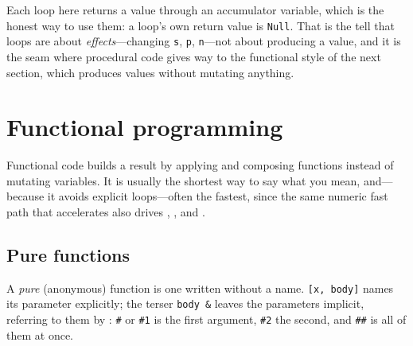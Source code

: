 Each loop here returns a value through an accumulator variable, which is the
honest way to use them: a loop's own return value is \texttt{Null}. That is the
tell that loops are about \emph{effects}---changing \texttt{s}, \texttt{p},
\texttt{n}---not about producing a value, and it is the seam where procedural code
gives way to the functional style of the next section, which produces values
without mutating anything.


\section{Functional programming}
\label{sec:prog-functional}

Functional code builds a result by applying and composing functions instead of
mutating variables. It is usually the shortest way to say what you mean, and---because
it avoids explicit loops---often the fastest, since the same numeric
fast path that accelerates  also drives , , and .

\subsection{Pure functions}
\label{ssec:prog-purefunc}

A \emph{pure} (anonymous) function is one written without a name.
\texttt{[x, body]} names its parameter explicitly; the terser
\texttt{body\,\&} leaves the parameters implicit, referring to them by
: \texttt{\#} or \texttt{\#1} is the first argument, \texttt{\#2} the
second, and  \texttt{\#\#} is all of them at once.

